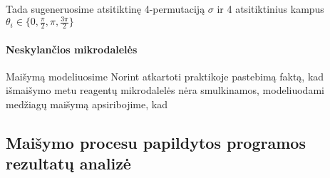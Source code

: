 Tada sugeneruosime atsitiktinę 4-permutaciją $\sigma$ ir 4 atsitiktinius kampus $\theta_i \in \{0, \frac{\pi}{2}, \pi, \frac{3\pi}{2}\}$


\paragraph{Neskylančios mikrodalelės}

Maišymą modeliuosime 
Norint atkartoti praktikoje pastebimą faktą, kad išmaišymo metu reagentų mikrodalelės nėra smulkinamos, modeliuodami medžiagų maišymą apsiribojime, kad 




\subsection{Maišymo procesu papildytos programos rezultatų analizė}

